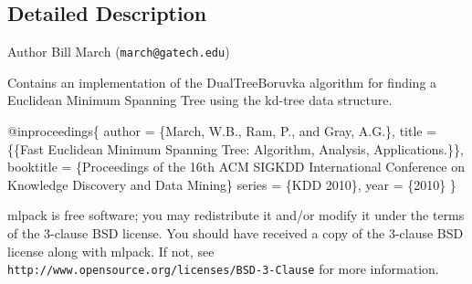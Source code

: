 \subsection{Detailed Description}
\begin{DoxyAuthor}{Author}
Bill March ({\tt march@gatech.\+edu})
\end{DoxyAuthor}
Contains an implementation of the Dual\+Tree\+Boruvka algorithm for finding a Euclidean Minimum Spanning Tree using the kd-\/tree data structure.


\begin{DoxyCode}
@inproceedings\{
  author = \{March, W.B., Ram, P., and Gray, A.G.\},
  title = \{\{Fast Euclidean Minimum Spanning Tree: Algorithm, Analysis,
     Applications.\}\},
  booktitle = \{Proceedings of the 16th ACM SIGKDD International Conference
     on Knowledge Discovery and Data Mining\}
  series = \{KDD 2010\},
  year = \{2010\}
\}
\end{DoxyCode}


mlpack is free software; you may redistribute it and/or modify it under the terms of the 3-\/clause B\+SD license. You should have received a copy of the 3-\/clause B\+SD license along with mlpack. If not, see {\tt http\+://www.\+opensource.\+org/licenses/\+B\+S\+D-\/3-\/\+Clause} for more information. 